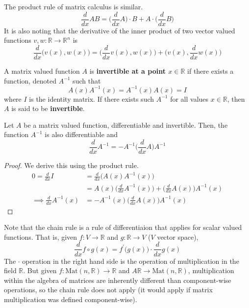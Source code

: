   The product rule of matrix calculus is similar.
  \begin{equation}
    \frac{d}{d x} A B = \bigg(\frac{d}{d x} A\bigg) \cdot B + A \cdot \bigg(\frac{d}{d x} B \bigg)
  \end{equation}
  It is also noting that the derivative of the inner product of two vector valued functions $v, w: \mathbb{R} \to \mathbb{R}^n$ is 
  \begin{equation}
    \frac{d}{d x} \big( v(x), w(x) \big) = \Big( \frac{d}{d x} v(x), w(x) \Big) + \Big( v(x), \frac{d}{d x} w(x) \Big)
  \end{equation}

  \begin{definition}
    A matrix valued function $A$ is \textbf{invertible at a point $x \in \mathbb{R}$} if there exists a function, denoted $A^{-1}$ such that
    \begin{equation}
      A(x) A^{-1} (x) = A^{-1}(x) A(x) = I
    \end{equation}
    where $I$ is the identity matrix. If there exists such $A^{-1}$ for all values $x \in \mathbb{R}$, then $A$ is said to be \textbf{invertible}. 
  \end{definition}

  \begin{theorem}
    Let $A$ be a matrix valued function, differentiable and invertible. Then, the function $A^{-1}$ is also differentiable and 
    \begin{equation}
      \frac{d}{d x} A^{-1} = - A^{-1} \bigg( \frac{d}{d x} A \bigg) A^{-1}
    \end{equation}
  \end{theorem}
  \begin{proof}
    We derive this using the product rule. 
    \begin{align*}
      0 = \frac{d}{d x} I & = \frac{d}{d x} \big( A(x) A^{-1} (x) \big) \\
      & = A(x) \bigg(\frac{d}{d x} A^{-1} (x) \bigg) + \bigg( \frac{d}{d x} A(x) \bigg) A^{-1} (x) \\
      \implies \frac{d}{d x} A^{-1} (x) & = - A^{-1} (x) \bigg( \frac{d}{d x} A(x) \bigg) A^{-1}(x)
    \end{align*}
  \end{proof}
  Note that the chain rule is a rule of differentiaion that applies for scalar valued functions. That is, given $f: V \to \mathbb{R}$ and $g: \mathbb{R} \to V$ ($V$ vector space), 
  \begin{equation}
    \frac{d}{d x} f \circ g (x) = f^\prime \big( g(x) \big) \cdot \frac{d}{d x} g(x)
  \end{equation}
  The $\cdot$ operation in the right hand side is the operation of multiplication in the field $\mathbb{R}$. But given $f: \text{Mat}(n, \mathbb{R}) \to \mathbb{R}$ and $A \mathbb{R} \to \text{Mat}(n, \mathbb{R})$, multiplication within the algebra of matrices are inherently different than component-wise operations, so the chain rule does not apply (it would apply if matrix multiplication was defined component-wise). 

